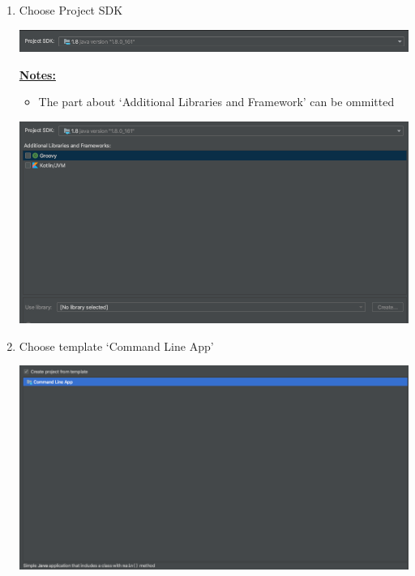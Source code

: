 \documentclass[12pt]{article}
\begin{document}
\begin{enumerate}[1.]
    \item Choose Project SDK


    \begin{center}
    \includegraphics[width=\linewidth]{images/part_2_notes_1.png}
    \end{center}

    \bigskip

    \underline{\textbf{Notes:}}

    \bigskip

    \begin{itemize}
        \item The part about `Additional Libraries and Framework' can be ommitted
    \end{itemize}

    \begin{center}
    \includegraphics[width=\linewidth]{images/part_2_notes_2.png}
    \end{center}

    \item Choose template `Command Line App'

    \begin{center}
    \includegraphics[width=\linewidth]{images/part_2_notes_3.png}
    \end{center}


\end{enumerate}
\end{document}
